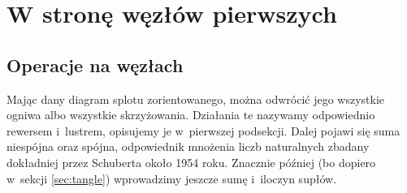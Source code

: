 
\chapter{W stronę węzłów pierwszych}
\section{Operacje na węzłach}
Mając dany diagram splotu zorientowanego, można odwrócić jego wszystkie ogniwa albo wszystkie skrzyżowania.
Działania te nazywamy odpowiednio rewersem i~lustrem, opisujemy je w~pierwszej podsekcji.
Dalej pojawi się suma niespójna oraz spójna, odpowiednik mnożenia liczb naturalnych zbadany dokładniej przez Schuberta około 1954 roku.
%
Znacznie później (bo dopiero w~sekcji \ref{sec:tangle}) wprowadzimy jeszcze sumę i~iloczyn supłów.







